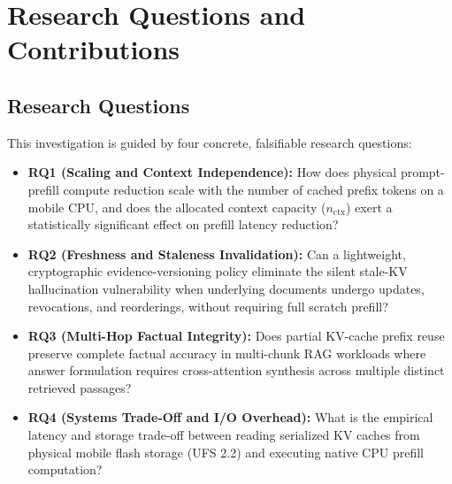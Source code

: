 \section{Research Questions and Contributions}
\label{sec:rq_contributions}

\subsection{Research Questions}
This investigation is guided by four concrete, falsifiable research questions:
\begin{itemize}
    \item \textbf{RQ1 (Scaling and Context Independence):} How does physical prompt-prefill compute reduction scale with the number of cached prefix tokens on a mobile CPU, and does the allocated context capacity ($n_{\text{ctx}}$) exert a statistically significant effect on prefill latency reduction?
    \item \textbf{RQ2 (Freshness and Staleness Invalidation):} Can a lightweight, cryptographic evidence-versioning policy eliminate the silent stale-KV hallucination vulnerability when underlying documents undergo updates, revocations, and reorderings, without requiring full scratch prefill?
    \item \textbf{RQ3 (Multi-Hop Factual Integrity):} Does partial KV-cache prefix reuse preserve complete factual accuracy in multi-chunk RAG workloads where answer formulation requires cross-attention synthesis across multiple distinct retrieved passages?
    \item \textbf{RQ4 (Systems Trade-Off and I/O Overhead):} What is the empirical latency and storage trade-off between reading serialized KV caches from physical mobile flash storage (UFS 2.2) and executing native CPU prefill computation?
\end{itemize}

